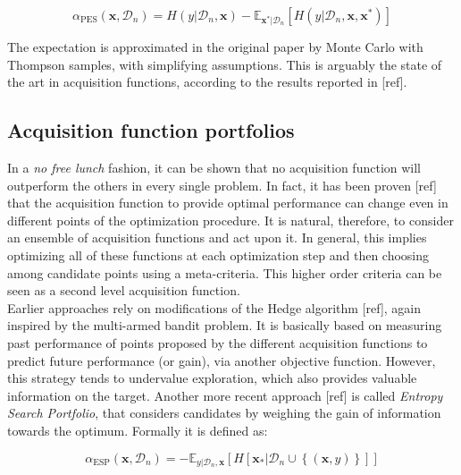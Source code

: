 \documentclass[10pt,a4paper,twoside]{book}
\begin{document}
\begin{equation}
\alpha_{\mathrm{PES}}(\boldsymbol{x}, \mathcal{D}_n) = H(y|\mathcal{D}_n, \boldsymbol{x}) - \mathbb{E}_{\boldsymbol{x}^*|\mathcal{D}_n}\left[ H(y |\mathcal{D}_n, \boldsymbol{x}, \boldsymbol{x}^*)  \right]
\end{equation}

The expectation is approximated in the original paper by Monte Carlo with Thompson samples, with simplifying assumptions. This is arguably the state of the art in acquisition functions, according to the results reported in [ref].\\

\subsection{Acquisition function portfolios}

In a \textit{no free lunch} fashion, it can be shown that no acquisition function will outperform the others in every single problem. In fact, it has been proven [ref] that the acquisition function to provide optimal performance can change even in different points of the optimization procedure. It is natural, therefore, to consider an ensemble of acquisition functions and act upon it. In general, this implies optimizing all of these functions at each optimization step and then choosing among candidate points using a meta-criteria. This higher order criteria can be seen as a second level acquisition function.\\

Earlier approaches rely on modifications of the Hedge algorithm [ref], again inspired by the multi-armed bandit problem. It is basically based on measuring past performance of points proposed by the different acquisition functions to predict future performance (or gain), via another objective function. However, this strategy tends to undervalue exploration, which also provides valuable information on the target. Another more recent approach [ref] is called \textit{Entropy Search Portfolio}, that considers candidates by weighing the gain of information towards the optimum. Formally it is defined as:

\begin{equation}
\alpha_{\mathrm{ESP}}(\boldsymbol{x}, \mathcal{D}_n) = - \mathbb{E}_{y|\mathcal{D}_n, \boldsymbol{x}}\left[ H \left[\boldsymbol{x}_* |\mathcal{D}_n \cup \left\lbrace  (\boldsymbol{x},y)\right\rbrace \right] \right]
\end{equation} 
\end{document}
